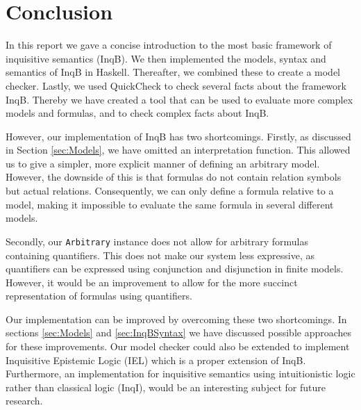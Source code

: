 \section{Conclusion}\label{sec:Conclusion}

In this report we gave a concise introduction to the most basic framework of inquisitive semantics (\textsf{InqB}). We then implemented the models, syntax and semantics of \textsf{InqB} in Haskell. Thereafter, we combined these to create a model checker. Lastly, we used QuickCheck to check several facts about the framework \textsf{InqB}. Thereby we have created a tool that can be used to evaluate more complex models and formulas, and to check complex facts about \textsf{InqB}.

However, our implementation of \textsf{InqB} has two shortcomings. Firstly, as discussed in Section \ref{sec:Models}, we have omitted an interpretation function. This allowed us to give a simpler, more explicit manner of defining an arbitrary model. However, the downside of this is that formulas do not contain relation symbols but actual relations. Consequently, we can only define a formula relative to a model, making it impossible to evaluate the same formula in several different models.

Secondly, our \verb|Arbitrary| instance does not allow for arbitrary formulas containing quantifiers. This does not make our system less expressive, as quantifiers can be expressed using conjunction and disjunction in finite models. However, it would be an improvement to allow for the more succinct representation of formulas using quantifiers.

Our implementation can be improved by overcoming these two shortcomings. In sections \ref{sec:Models} and \ref{sec:InqBSyntax} we have discussed possible approaches for these improvements. Our model checker could also be extended to implement Inquisitive Epistemic Logic (\textsf{IEL}) which is a proper extension of \textsf{InqB}. Furthermore, an implementation for inquisitive semantics using intuitionistic logic rather than classical logic (\textsf{InqI}), would be an interesting subject for future research.

